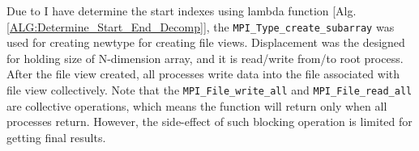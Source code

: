 Due to I have determine the start indexes using lambda function 
                                  [Alg. \ref{ALG:Determine_Start_End_Decomp}],
the \texttt{MPI\_Type\_create\_subarray} was used for creating newtype for creating file views.
Displacement was the designed for holding size of N-dimension array, and it is read/write from/to root process.
After the file view created, all processes write data into the file associated with file view collectively.
Note that the \texttt{MPI\_File\_write\_all} and \texttt{MPI\_File\_read\_all} are collective 
operations, which means the function will return only when all processes return.
However, the side-effect of such blocking operation is limited for getting final results.














































































































